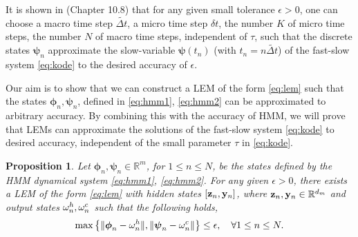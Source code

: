 \documentclass{article} \usepackage{iclr2022_conference,times}
\newcommand{\by}{{\bf y}}
\newcommand{\bz}{{\bf z}}
\newcommand{\bc}{{\boldsymbol{\psi}}}
\newcommand{\bh}{{\boldsymbol{\phi}}}
\newcommand{\R}{{\mathbb R}}
\newcommand{\Dt}{{\Delta t}}
\newcommand{\bom}{{\bf \omega}}
\newtheorem{proposition}[theorem]{Proposition}
\begin{document}
It is shown in \cite{Kuhn_book} (Chapter 10.8) that for any given small tolerance $\epsilon > 0$, one can choose a macro time step $\tilde{\Dt}$, a micro time step $\delta t$, the number $K$ of micro time steps, the number $N$ of macro time steps, independent of $\tau$, such that the discrete states $\bc_n$ approximate the slow-variable $\bc(t_n)$ (with $t_n = n \tilde{\Dt}$) of the fast-slow system \eqref{eq:kode} to the desired accuracy of $\epsilon$. 

Our aim is to show that we can construct a LEM of the form \eqref{eq:lem} such that the states $\bh_n,\bc_n$, defined in \eqref{eq:hmm1}, \eqref{eq:hmm2} can be approximated to arbitrary accuracy. By combining this with the accuracy of HMM, we will prove that LEMs can approximate the solutions of the fast-slow system \eqref{eq:kode} to desired accuracy, independent of the small parameter $\tau$ in \eqref{eq:kode}. 
\begin{proposition}
\label{prop:hmm}
Let $\bh_n,\bc_n \in \R^{m}$, for $1 \leq n \leq N$, be the states defined by the HMM dynamical system \eqref{eq:hmm1}, \eqref{eq:hmm2}. For any given $\epsilon > 0$, there exists a LEM of the form \eqref{eq:lem} with hidden states $[\bz_n,\by_n]$, where $\bz_n,\by_n \in \R^{d_m}$ and output states $\bom^h_n,\bom^c_n$ such that the following holds, 
\begin{equation}
    \label{eq:phmm}
    \max\left\{\|\bh_n - \bom^h_n\|, \|\bc_n - \bom^c_n\|   \right\} \leq \epsilon, \quad \forall 1 \leq n \leq N. 
\end{equation}
\end{proposition}
\end{document}
